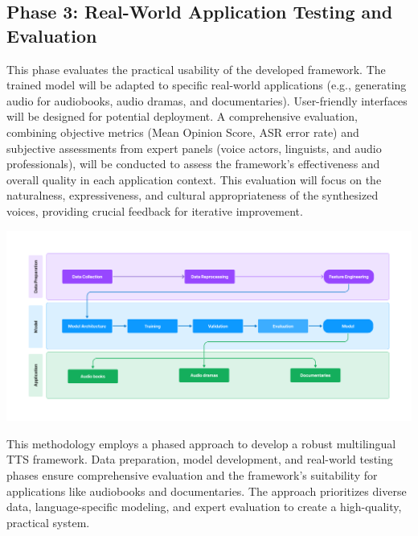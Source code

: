 \subsection*{Phase 3: Real-World Application Testing and Evaluation}
This phase evaluates the practical usability of the developed framework. The trained model will be adapted to specific real-world applications (e.g., generating audio for audiobooks, audio dramas, and documentaries). User-friendly interfaces will be designed for potential deployment. A comprehensive evaluation, combining objective metrics (Mean Opinion Score, ASR error rate) and subjective assessments from expert panels (voice actors, linguists, and audio professionals), will be conducted to assess the framework's effectiveness and overall quality in each application context. This evaluation will focus on the naturalness, expressiveness, and cultural appropriateness of the synthesized voices, providing crucial feedback for iterative improvement.

\begin{center}
    \includegraphics[width=1.0\textwidth]{research-flow.png}
\end{center}

This methodology employs a phased approach to develop a robust multilingual TTS framework. Data preparation, model development, and real-world testing phases ensure comprehensive evaluation and the framework's suitability for applications like audiobooks and documentaries. The approach prioritizes diverse data, language-specific modeling, and expert evaluation to create a high-quality, practical system.